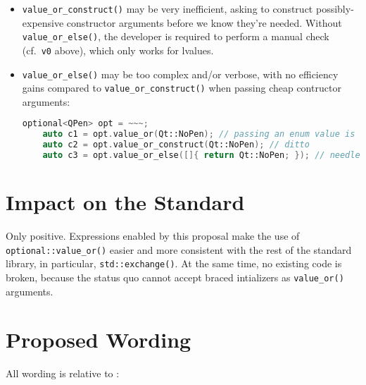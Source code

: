 \documentclass[11pt]{article}
\begin{document}
\begin{itemize}
\item\texttt{value\_or\_construct()} may be very inefficient, asking
  to construct possibly-expensive constructor arguments before we know
  they're needed. Without \texttt{value\_or\_else()}, the developer is
  required to perform a manual check (cf.~\texttt{v0} above), which
  only works for lvalues.
\item\texttt{value\_or\_else()} may be too complex and/or verbose,
  with no efficiency gains compared to \texttt{value\_or\_construct()}
  when passing cheap contructor arguments:
  \begin{lstlisting}[language=c++]
    optional<QPen> opt = ~~~;
    auto c1 = opt.value_or(Qt::NoPen); // passing an enum value is cheap
    auto c2 = opt.value_or_construct(Qt::NoPen); // ditto
    auto c3 = opt.value_or_else([]{ return Qt::NoPen; }); // needlessly verbose
  \end{lstlisting}
\end{itemize}

\section{Impact on the Standard}

Only positive. Expressions enabled by this proposal make the use of
\texttt{optional::value\_or()} easier and more consistent with the
rest of the standard library, in particular,
\texttt{std::exchange()}. At the same time, no existing code is
broken, because the status quo cannot accept braced intializers as
\texttt{value\_or()} arguments.

\section{Proposed Wording}

All wording is relative to \cite{cpp2a}:
\end{document}

